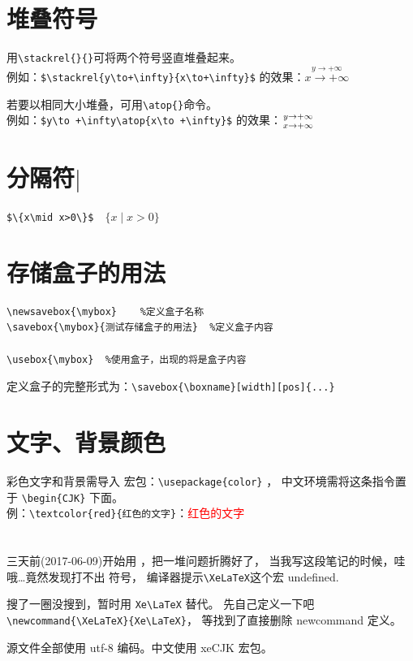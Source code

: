 \documentclass[a4paper,11pt]{article}
\begin{document}
\section{堆叠符号}
用\verb+\stackrel{}{}+可将两个符号竖直堆叠起来。\\
例如：\verb|$\stackrel{y\to+\infty}{x\to+\infty}$|
的效果：$\stackrel{y\to +\infty}{x\to +\infty}$

若要以相同大小堆叠，可用\verb+\atop{}+命令。\\
例如：\verb|$y\to +\infty\atop{x\to +\infty}$|
的效果：$y\to +\infty\atop{x\to +\infty}$

\section{分隔符$\mid$}
\verb+$\{x\mid x>0\}$+$\quad\{x\mid x>0\}$

\section{存储盒子的用法}
\begin{Verbatim}
\newsavebox{\mybox}    %定义盒子名称
\savebox{\mybox}{测试存储盒子的用法}  %定义盒子内容

\usebox{\mybox}  %使用盒子，出现的将是盒子内容
\end{Verbatim}
定义盒子的完整形式为：\verb+\savebox{\boxname}[width][pos]{...}+

\section{文字、背景颜色}
彩色文字和背景需导入  宏包：\verb+\usepackage{color}+ ，
中文环境需将这条指令置于 \verb+\begin{CJK}+ 下面。\\
例：\verb+\textcolor{red}{红色的文字}+：\textcolor{red}{红色的文字}

\section{\XeLaTeX}
三天前(2017-06-09)开始用 \XeLaTeX ，把一堆问题折腾好了，
当我写这段笔记的时候，哇哦\ldots 竟然发现打不出 \XeLaTeX 符号，
编译器提示\verb+\XeLaTeX+这个宏 undefined.

搜了一圈没搜到，暂时用 \verb+Xe\LaTeX+ 替代。
先自己定义一下吧 \verb+\newcommand{\XeLaTeX}{Xe\LaTeX}+，
等找到了直接删除 newcommand 定义。

源文件全部使用 utf-8 编码。中文使用 xeCJK 宏包。
\end{document}
